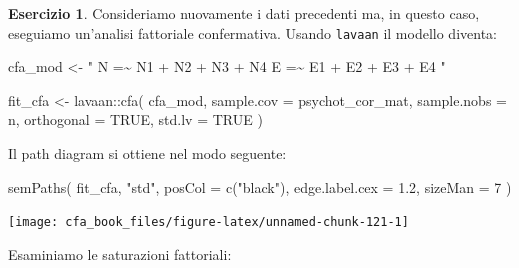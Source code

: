 \documentclass[
  11pt,
]{krantz}
\makeatletter
\newenvironment{Shaded}{\begin{snugshade}}{\end{snugshade}}
\newcommand{\AttributeTok}[1]{\textcolor[rgb]{0.61,0.61,0.61}{#1}}
\newcommand{\ConstantTok}[1]{\textcolor[rgb]{0,0,0}{#1}}
\newcommand{\DecValTok}[1]{\textcolor[rgb]{0.06,0.06,0.06}{#1}}
\newcommand{\FloatTok}[1]{\textcolor[rgb]{0.06,0.06,0.06}{#1}}
\newcommand{\FunctionTok}[1]{\textcolor[rgb]{0,0,0}{#1}}
\newcommand{\NormalTok}[1]{#1}
\newcommand{\OtherTok}[1]{\textcolor[rgb]{0.37,0.37,0.37}{#1}}
\newcommand{\SpecialCharTok}[1]{\textcolor[rgb]{0,0,0}{#1}}
\newcommand{\StringTok}[1]{\textcolor[rgb]{0.5,0.5,0.5}{#1}}
\newenvironment{kframe}{%
\medskip{}
\setlength{\fboxsep}{.8em}
 \def\at@end@of@kframe{}%
 \ifinner\ifhmode%
  \def\at@end@of@kframe{\end{minipage}}%
  \begin{minipage}{\columnwidth}%
 \fi\fi%
 \def\FrameCommand##1{\hskip\@totalleftmargin \hskip-\fboxsep
 \colorbox{shadecolor}{##1}\hskip-\fboxsep
     \hskip-\linewidth \hskip-\@totalleftmargin \hskip\columnwidth}%
 \MakeFramed {\advance\hsize-\width
   \@totalleftmargin\z@ \linewidth\hsize
   \@setminipage}}%
 {\par\unskip\endMakeFramed%
 \at@end@of@kframe}
\renewenvironment{Shaded}{\begin{kframe}}{\end{kframe}}
\theoremstyle{definition}
\theoremstyle{definition}
\theoremstyle{definition}
\newtheorem{exercise}{Esercizio}[chapter]
\theoremstyle{definition}
\theoremstyle{remark}
\makeatother
\begin{document}
\begin{exercise}
Consideriamo nuovamente i dati precedenti ma, in questo caso, eseguiamo un'analisi fattoriale confermativa. Usando \texttt{lavaan} il modello diventa:

\begin{Shaded}
\begin{Highlighting}[]
\NormalTok{cfa\_mod }\OtherTok{\textless{}{-}} \StringTok{"}
\StringTok{  N =\textasciitilde{} N1 + N2 + N3 + N4}
\StringTok{  E =\textasciitilde{} E1 + E2 + E3 + E4}
\StringTok{"}
\end{Highlighting}
\end{Shaded}

\begin{Shaded}
\begin{Highlighting}[]
\NormalTok{fit\_cfa }\OtherTok{\textless{}{-}}\NormalTok{ lavaan}\SpecialCharTok{::}\FunctionTok{cfa}\NormalTok{(}
\NormalTok{  cfa\_mod,}
  \AttributeTok{sample.cov =}\NormalTok{ psychot\_cor\_mat,}
  \AttributeTok{sample.nobs =}\NormalTok{ n,}
  \AttributeTok{orthogonal =} \ConstantTok{TRUE}\NormalTok{,}
  \AttributeTok{std.lv =} \ConstantTok{TRUE}
\NormalTok{)}
\end{Highlighting}
\end{Shaded}

Il path diagram si ottiene nel modo seguente:

\begin{Shaded}
\begin{Highlighting}[]
\FunctionTok{semPaths}\NormalTok{(}
\NormalTok{  fit\_cfa,}
  \StringTok{"std"}\NormalTok{,}
  \AttributeTok{posCol =} \FunctionTok{c}\NormalTok{(}\StringTok{"black"}\NormalTok{),}
  \AttributeTok{edge.label.cex =} \FloatTok{1.2}\NormalTok{,}
  \AttributeTok{sizeMan =} \DecValTok{7}
\NormalTok{)}
\end{Highlighting}
\end{Shaded}

\begin{center}\texttt{[image: cfa\_book\_files/figure-latex/unnamed-chunk-121-1]} \end{center}

Esaminiamo le saturazioni fattoriali:


\end{exercise}
\end{document}
